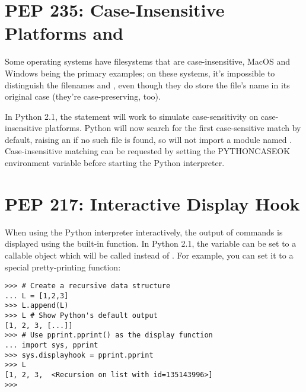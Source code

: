 \documentclass{howto}
\begin{document}
\begin{seealso}


\end{seealso}

\section{PEP 235: Case-Insensitive Platforms and }

Some operating systems have filesystems that are case-insensitive,
MacOS and Windows being the primary examples; on these systems, it's
impossible to distinguish the filenames  and
, even though they do store the file's name 
in its original case (they're case-preserving, too).

In Python 2.1, the  statement will work to simulate
case-sensitivity on case-insensitive platforms.  Python will now
search for the first case-sensitive match by default, raising an
 if no such file is found, so 
will not import a module named .  Case-insensitive
matching can be requested by setting the PYTHONCASEOK environment
variable before starting the Python interpreter.

\section{PEP 217: Interactive Display Hook}

When using the Python interpreter interactively, the output of
commands is displayed using the built-in  function.
In Python 2.1, the variable  can be set to a
callable object which will be called instead of .
For example, you can set it to a special pretty-printing function:

\begin{verbatim}
>>> # Create a recursive data structure
... L = [1,2,3]
>>> L.append(L)
>>> L # Show Python's default output
[1, 2, 3, [...]]
>>> # Use pprint.pprint() as the display function
... import sys, pprint
>>> sys.displayhook = pprint.pprint
>>> L
[1, 2, 3,  <Recursion on list with id=135143996>]
>>>
\end{verbatim}
\end{document}
